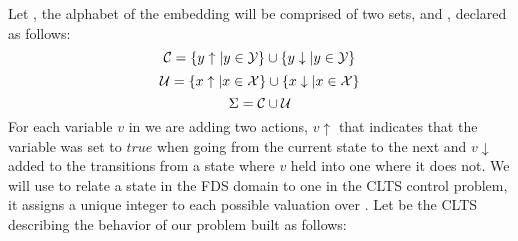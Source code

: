 %
Let \fdsControlProblemDef, the alphabet of the embedding will be comprised of two sets, \controlSet and \nonControlSet, declared as follows:
\[\mathcal{C} = \{y\uparrow | y \in {\ensuremath{\mathcal{Y}}} \} \cup \{y\downarrow | y \in {\ensuremath{\mathcal{Y}}} \}\]
\[\mathcal{U} = \{x\uparrow | x \in {\ensuremath{\mathcal{X}}} \} \cup \{x\downarrow | x \in {\ensuremath{\mathcal{X}}} \}\]
\[\Sigma = \mathcal{C} \cup \mathcal{U} \]
For each variable $v$ in \fdsControlProblem we are adding two actions, $v\uparrow$ that indicates that the variable was set to $true$ when going from the current state to the next and $v\downarrow$ added to the transitions from a state where $v$ held into one where it does not.
We will use \enumStateSetDef to relate a state in the FDS domain to one in the CLTS control problem, it assigns a unique integer to each possible valuation over \gsV.
Let \cltsDef be the CLTS describing the behavior of our problem built as follows:

